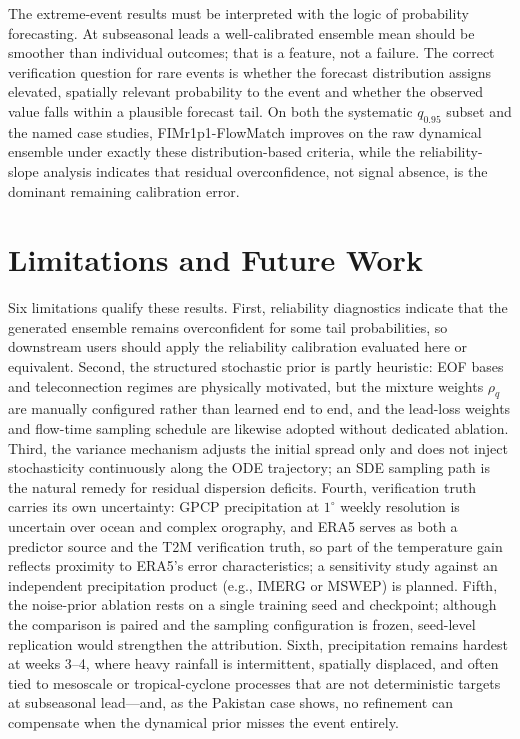 \documentclass[11pt]{article}
\newcommand{\modelshort}{FIMr1p1}
\newcommand{\methodname}{\modelshort{}-FlowMatch}
\begin{document}
The extreme-event results must be interpreted with the logic of probability forecasting. At subseasonal leads a well-calibrated ensemble mean should be smoother than individual outcomes; that is a feature, not a failure. The correct verification question for rare events is whether the forecast distribution assigns elevated, spatially relevant probability to the event and whether the observed value falls within a plausible forecast tail. On both the systematic $q_{0.95}$ subset and the named case studies, \methodname{} improves on the raw dynamical ensemble under exactly these distribution-based criteria, while the reliability-slope analysis indicates that residual overconfidence, not signal absence, is the dominant remaining calibration error.

\section{Limitations and Future Work}
\label{sec:limitations}

Six limitations qualify these results. First, reliability diagnostics indicate that the generated ensemble remains overconfident for some tail probabilities, so downstream users should apply the reliability calibration evaluated here or equivalent. Second, the structured stochastic prior is partly heuristic: EOF bases and teleconnection regimes are physically motivated, but the mixture weights $\rho_q$ are manually configured rather than learned end to end, and the lead-loss weights and flow-time sampling schedule are likewise adopted without dedicated ablation. Third, the variance mechanism adjusts the initial spread only and does not inject stochasticity continuously along the ODE trajectory; an SDE sampling path is the natural remedy for residual dispersion deficits. Fourth, verification truth carries its own uncertainty: GPCP precipitation at $1^\circ$ weekly resolution is uncertain over ocean and complex orography, and ERA5 serves as both a predictor source and the T2M verification truth, so part of the temperature gain reflects proximity to ERA5's error characteristics; a sensitivity study against an independent precipitation product (e.g., IMERG or MSWEP) is planned. Fifth, the noise-prior ablation rests on a single training seed and checkpoint; although the comparison is paired and the sampling configuration is frozen, seed-level replication would strengthen the attribution. Sixth, precipitation remains hardest at weeks 3--4, where heavy rainfall is intermittent, spatially displaced, and often tied to mesoscale or tropical-cyclone processes that are not deterministic targets at subseasonal lead---and, as the Pakistan case shows, no refinement can compensate when the dynamical prior misses the event entirely.
\end{document}
